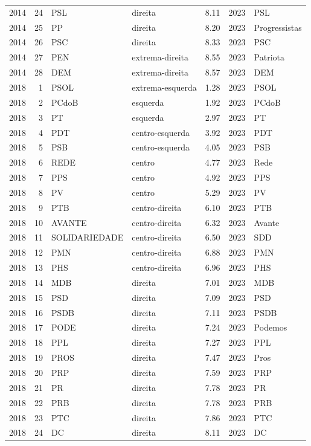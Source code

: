 \begin{longtable}{rrlllrl}
2014 & 24 & PSL & direita & 8.11 & 2023 & PSL \\
2014 & 25 & PP & direita & 8.20 & 2023 & Progressistas \\
2014 & 26 & PSC & direita & 8.33 & 2023 & PSC \\
2014 & 27 & PEN & extrema-direita & 8.55 & 2023 & Patriota \\
2014 & 28 & DEM & extrema-direita & 8.57 & 2023 & DEM \\
2018 & 1 & PSOL & extrema-esquerda & 1.28 & 2023 & PSOL \\
2018 & 2 & PCdoB & esquerda & 1.92 & 2023 & PCdoB \\
2018 & 3 & PT & esquerda & 2.97 & 2023 & PT \\
2018 & 4 & PDT & centro-esquerda & 3.92 & 2023 & PDT \\
2018 & 5 & PSB & centro-esquerda & 4.05 & 2023 & PSB \\
2018 & 6 & REDE & centro & 4.77 & 2023 & Rede \\
2018 & 7 & PPS & centro & 4.92 & 2023 & PPS \\
2018 & 8 & PV & centro & 5.29 & 2023 & PV \\
2018 & 9 & PTB & centro-direita & 6.10 & 2023 & PTB \\
2018 & 10 & AVANTE & centro-direita & 6.32 & 2023 & Avante \\
2018 & 11 & SOLIDARIEDADE & centro-direita & 6.50 & 2023 & SDD \\
2018 & 12 & PMN & centro-direita & 6.88 & 2023 & PMN \\
2018 & 13 & PHS & centro-direita & 6.96 & 2023 & PHS \\
2018 & 14 & MDB & direita & 7.01 & 2023 & MDB \\
2018 & 15 & PSD & direita & 7.09 & 2023 & PSD \\
2018 & 16 & PSDB & direita & 7.11 & 2023 & PSDB \\
2018 & 17 & PODE & direita & 7.24 & 2023 & Podemos \\
2018 & 18 & PPL & direita & 7.27 & 2023 & PPL \\
2018 & 19 & PROS & direita & 7.47 & 2023 & Pros \\
2018 & 20 & PRP & direita & 7.59 & 2023 & PRP \\
2018 & 21 & PR & direita & 7.78 & 2023 & PR \\
2018 & 22 & PRB & direita & 7.78 & 2023 & PRB \\
2018 & 23 & PTC & direita & 7.86 & 2023 & PTC \\
2018 & 24 & DC & direita & 8.11 & 2023 & DC \\

\end{longtable}
